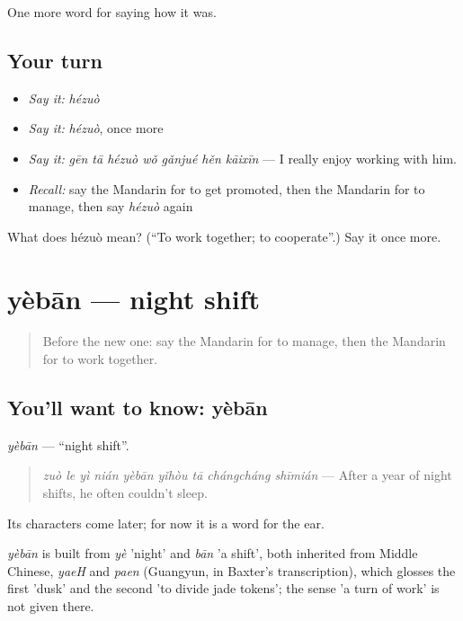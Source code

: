 \begin{grammarlens}[title={What you've built}]
One more word for saying how it was.
\end{grammarlens}

\subsection*{Your turn}
\begin{itemize}
\raggedright
  \item \emph{Say it:} \emph{hézuò}
  \item \emph{Say it:} \emph{hézuò}, once more
  \item \emph{Say it:} \emph{gēn tā hézuò wǒ gǎnjué hěn kāixīn} — I really enjoy working with him.
  \item \emph{Recall:} say the Mandarin for to get promoted, then the Mandarin for to manage, then say \emph{hézuò} again
\end{itemize}

\begin{tcolorbox}[breakable,colback=teal!4,colframe=teal!35!black,title={Before you move on}]
What does hézuò mean? (\textquotedblleft{}To work together; to cooperate\textquotedblright{}.) Say it once more.
\end{tcolorbox}
\section[yèbān]{yèbān — night shift}

\label{lesson:ZH-C490-yeban}



\begin{quote}
Before the new one: say the Mandarin for to manage, then the Mandarin for to work together.
\end{quote}

\subsection*{You'll want to know: yèbān}
\emph{yèbān} — \textquotedblleft{}night shift\textquotedblright{}.

\begin{quote}
\emph{zuò le yì nián yèbān yǐhòu tā chángcháng shīmián} — After a year of night shifts, he often couldn't sleep.
\end{quote}

Its characters come later; for now it is a word for the ear.

\begin{cousinweb}
\emph{yèbān} is built from \emph{yè} 'night' and \emph{bān} 'a shift', both inherited from Middle Chinese, \emph{yaeH} and \emph{paen} (Guangyun, in Baxter's transcription), which glosses the first 'dusk' and the second 'to divide jade tokens'; the sense 'a turn of work' is not given there.
\end{cousinweb}

